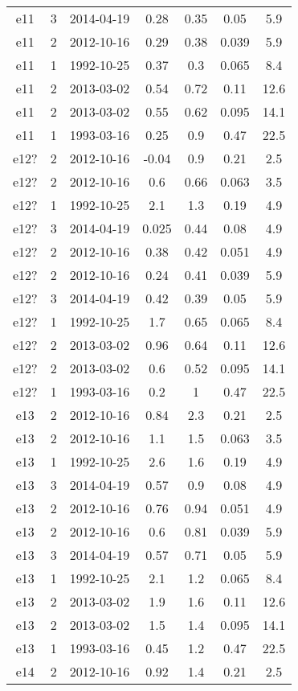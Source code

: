 \begin{longtable}[htp]
\begin{longtable}{ccccccc}
e11 & 3 & 2014-04-19 & 0.28 & 0.35 & 0.05 & 5.9 \\
e11 & 2 & 2012-10-16 & 0.29 & 0.38 & 0.039 & 5.9 \\
e11 & 1 & 1992-10-25 & 0.37 & 0.3 & 0.065 & 8.4 \\
e11 & 2 & 2013-03-02 & 0.54 & 0.72 & 0.11 & 12.6 \\
e11 & 2 & 2013-03-02 & 0.55 & 0.62 & 0.095 & 14.1 \\
e11 & 1 & 1993-03-16 & 0.25 & 0.9 & 0.47 & 22.5 \\
e12? & 2 & 2012-10-16 & -0.04 & 0.9 & 0.21 & 2.5 \\
e12? & 2 & 2012-10-16 & 0.6 & 0.66 & 0.063 & 3.5 \\
e12? & 1 & 1992-10-25 & 2.1 & 1.3 & 0.19 & 4.9 \\
e12? & 3 & 2014-04-19 & 0.025 & 0.44 & 0.08 & 4.9 \\
e12? & 2 & 2012-10-16 & 0.38 & 0.42 & 0.051 & 4.9 \\
e12? & 2 & 2012-10-16 & 0.24 & 0.41 & 0.039 & 5.9 \\
e12? & 3 & 2014-04-19 & 0.42 & 0.39 & 0.05 & 5.9 \\
e12? & 1 & 1992-10-25 & 1.7 & 0.65 & 0.065 & 8.4 \\
e12? & 2 & 2013-03-02 & 0.96 & 0.64 & 0.11 & 12.6 \\
e12? & 2 & 2013-03-02 & 0.6 & 0.52 & 0.095 & 14.1 \\
e12? & 1 & 1993-03-16 & 0.2 & 1 & 0.47 & 22.5 \\
e13 & 2 & 2012-10-16 & 0.84 & 2.3 & 0.21 & 2.5 \\
e13 & 2 & 2012-10-16 & 1.1 & 1.5 & 0.063 & 3.5 \\
e13 & 1 & 1992-10-25 & 2.6 & 1.6 & 0.19 & 4.9 \\
e13 & 3 & 2014-04-19 & 0.57 & 0.9 & 0.08 & 4.9 \\
e13 & 2 & 2012-10-16 & 0.76 & 0.94 & 0.051 & 4.9 \\
e13 & 2 & 2012-10-16 & 0.6 & 0.81 & 0.039 & 5.9 \\
e13 & 3 & 2014-04-19 & 0.57 & 0.71 & 0.05 & 5.9 \\
e13 & 1 & 1992-10-25 & 2.1 & 1.2 & 0.065 & 8.4 \\
e13 & 2 & 2013-03-02 & 1.9 & 1.6 & 0.11 & 12.6 \\
e13 & 2 & 2013-03-02 & 1.5 & 1.4 & 0.095 & 14.1 \\
e13 & 1 & 1993-03-16 & 0.45 & 1.2 & 0.47 & 22.5 \\
e14 & 2 & 2012-10-16 & 0.92 & 1.4 & 0.21 & 2.5 \\

\end{longtable}
\end{longtable}
